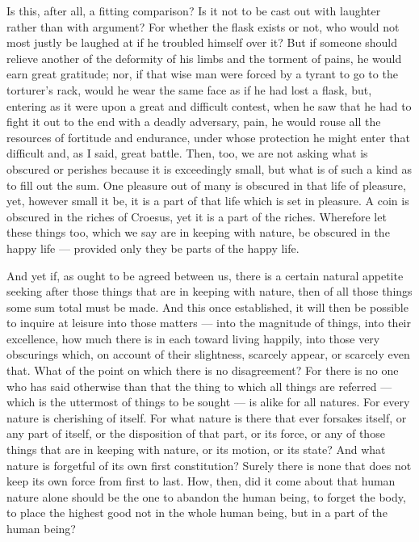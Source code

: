  Is this, after all, a fitting comparison? Is it not to be cast out with laughter rather than with argument? For whether the flask exists or not, who would not most justly be laughed at if he troubled himself over it? But if someone should relieve another of the deformity of his limbs and the torment of pains, he would earn great gratitude; nor, if that wise man were forced by a tyrant to go to the torturer's rack, would he wear the same face as if he had lost a flask, but, entering as it were upon a great and difficult contest, when he saw that he had to fight it out to the end with a deadly adversary, pain, he would rouse all the resources of fortitude and endurance, under whose protection he might enter that difficult and, as I said, great battle. Then, too, we are not asking what is obscured or perishes because it is exceedingly small, but what is of such a kind as to fill out the sum. One pleasure out of many is obscured in that life of pleasure, yet, however small it be, it is a part of that life which is set in pleasure. A coin is obscured in the riches of Croesus, yet it is a part of the riches. Wherefore let these things too, which we say are in keeping with nature, be obscured in the happy life — provided only they be parts of the happy life.

 And yet if, as ought to be agreed between us, there is a certain natural appetite seeking after those things that are in keeping with nature, then of all those things some sum total must be made. And this once established, it will then be possible to inquire at leisure into those matters — into the magnitude of things, into their excellence, how much there is in each toward living happily, into those very obscurings which, on account of their slightness, scarcely appear, or scarcely even that. What of the point on which there is no disagreement? For there is no one who has said otherwise than that the thing to which all things are referred — which is the uttermost of things to be sought — is alike for all natures. For every nature is cherishing of itself. For what nature is there that ever forsakes itself, or any part of itself, or the disposition of that part, or its force, or any of those things that are in keeping with nature, or its motion, or its state? And what nature is forgetful of its own first constitution? Surely there is none that does not keep its own force from first to last. How, then, did it come about that human nature alone should be the one to abandon the human being, to forget the body, to place the highest good not in the whole human being, but in a part of the human being?

